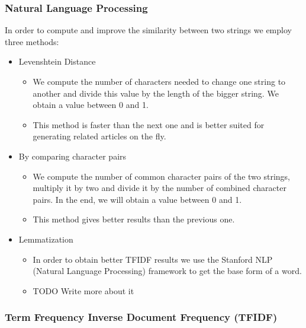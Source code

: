 \subsubsection{Natural Language Processing}
\label{sec:natural-language-processing}
In order to compute and improve the similarity between two strings we employ three methods:
\begin{itemize}
	\item Levenshtein Distance
	\begin{itemize}
		\item We compute the number of characters needed to change one string to another and divide this value by the length of the bigger string. We obtain a value between 0 and 1.
		\item This method is faster than the next one and is better suited for generating related articles on the fly.
	\end{itemize}
	\item By comparing character pairs
	\begin{itemize}
		\item We compute the number of common character pairs of the two strings, multiply it by two and divide it by the number of combined character pairs. In the end, we will obtain a value between 0 and 1.
		\item This method gives better results than the previous one.
	\end{itemize}
	\item Lemmatization
	\begin{itemize}
		\item In order to obtain better TFIDF results we use the Stanford NLP (Natural Language Processing) framework to get the base form of a word.
		\item TODO Write more about it
	\end{itemize}
\end{itemize}

\subsubsection{Term Frequency Inverse Document Frequency (TFIDF)}
\label{sec:TFIDF}

